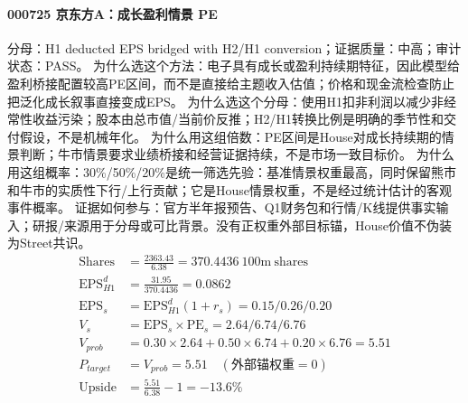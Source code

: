 \paragraph{000725 京东方A：成长盈利情景 PE}
分母：H1 deducted EPS bridged with H2/H1 conversion；证据质量：中高；审计状态：PASS。
为什么选这个方法：电子具有成长或盈利持续期特征，因此模型给盈利桥接配置较高PE区间，而不是直接给主题收入估值；价格和现金流检查防止把泛化成长叙事直接变成EPS。
为什么选这个分母：使用H1扣非利润以减少非经常性收益污染；股本由总市值/当前价反推；H2/H1转换比例是明确的季节性和交付假设，不是机械年化。
为什么用这组倍数：PE区间是House对成长持续期的情景判断；牛市情景要求业绩桥接和经营证据持续，不是市场一致目标价。
为什么用这组概率：30\%/50\%/20\%是统一筛选先验：基准情景权重最高，同时保留熊市和牛市的实质性下行/上行贡献；它是House情景权重，不是经过统计估计的客观事件概率。
证据如何参与：官方半年报预告、Q1财务包和行情/K线提供事实输入；研报/来源用于分母或可比背景。没有正权重外部目标锚，House价值不伪装为Street共识。
\begin{align*}
\mathrm{Shares} &= \frac{2363.43}{6.38}=370.4436\ \mathrm{100m\ shares}\\
\mathrm{EPS}_{H1}^d &= \frac{31.95}{370.4436}=0.0862\\
\mathrm{EPS}_s &= \mathrm{EPS}_{H1}^d(1+r_s)=0.15/0.26/0.20\\
V_s &= \mathrm{EPS}_s\times \mathrm{PE}_s=2.64/6.74/6.76\\
V_{prob} &= 0.30\times 2.64+0.50\times 6.74+0.20\times 6.76=5.51\\
P_{target} &= V_{prob}=5.51\quad(\text{外部锚权重}=0)\\
\mathrm{Upside} &= \frac{5.51}{6.38}-1=-13.6\%\\
\end{align*}

